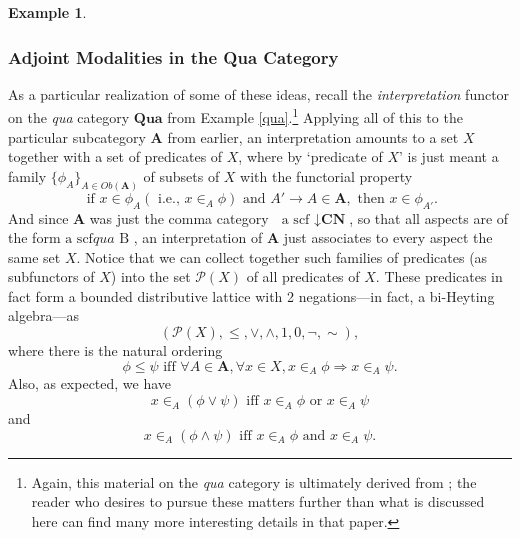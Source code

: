 \documentclass[a4paper]{book}
\theoremstyle{definition}
\newtheorem{example}{Example}[section]
\theoremstyle{definition}
\theoremstyle{definition}
\theoremstyle{theorem}
\theoremstyle{definition}
\begin{document}
\begin{example}
	\subsubsection{Adjoint Modalities in the Qua Category}
	As a particular realization of some of these ideas, recall the \textit{interpretation} functor on the \textit{qua} category $\textbf{Qua}$ from Example \ref{qua}.\footnote{Again, this material on the \textit{qua} category is ultimately derived from \cite{la_palme_reyes_models_1999}; the reader who desires to pursue these matters further than what is discussed here can find many more interesting details in that paper.} Applying all of this to the particular subcategory $\textbf{A}$ from earlier, an interpretation amounts to a set $X$ together with a set of predicates of $X$, where by `predicate of $X$' is just meant a family $\{\phi_A \}_{A \in Ob(\textbf{A})}$ of subsets of $X$ with the functorial property
	\begin{equation*}
	\text{ if } x \in \phi_A (\text{ i.e., } x \in_A \phi) \text{ and } A' \rightarrow A \in \textbf{A}, \text{ then } x \in \phi_{A'}. 
	\end{equation*}
	And since $\textbf{A}$ was just the comma category $\boxed{\text{ a scf }} \downarrow \textbf{CN}$, so that all aspects are of the form $\boxed{\text{a scf}}qua \boxed{\text{ B }}$, an interpretation of $\textbf{A}$ just associates to every aspect the same set $X$. Notice that we can collect together such families of predicates (as subfunctors of $X$) into the set $\mathcal{P}(X)$ of all predicates of $X$. These predicates in fact form a bounded distributive lattice with 2 negations---in fact, a bi-Heyting algebra---as
	\begin{equation*}
	(\mathcal{P}(X), \leq, \vee, \wedge, 1, 0, \neg, \sim),
	\end{equation*} 
	where there is the natural ordering 
	\begin{equation*}
	\phi \leq \psi \text{ iff } \forall A \in \textbf{A}, \forall x \in X, x \in_A \phi \Rightarrow x \in_A \psi.
	\end{equation*} 
	Also, as expected, we have 
	\begin{equation*}
	x \in_A (\phi \vee \psi) \text{ iff } x \in_A \phi \text{ or } x \in_A \psi 
	\end{equation*}
	and 
	\begin{equation*}
	x \in_A (\phi \wedge \psi) \text{ iff } x \in_A \phi \text{ and } x \in_A \psi . 

\end{equation*}
\end{example}
\end{document}
